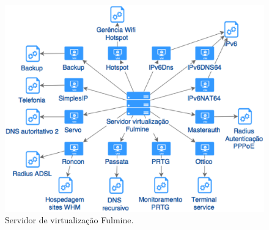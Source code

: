 \begin{figure}[h!]
 \centering
 \includegraphics[width=430px]{img/serv_fulmine.eps}
 \caption{Servidor de virtualização Fulmine.}
 \label{fig:serv_fulmine}
\end{figure}

